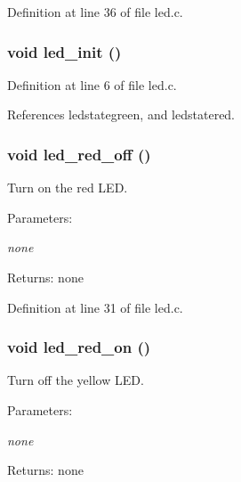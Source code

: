 Definition at line 36 of file led.c.
\subsubsection{\setlength{\rightskip}{0pt plus 5cm}void led\_\-init ()}\label{led_8h_7b3b624857fba1776c75412289a20230}




Definition at line 6 of file led.c.

References ledstategreen, and ledstatered.
\subsubsection{\setlength{\rightskip}{0pt plus 5cm}void led\_\-red\_\-off ()}\label{led_8h_d6f6083af3526114311748a49640254f}


Turn on the red LED. 

\begin{Desc}
\item[Parameters:]
\begin{description}
\item[{\em none}]\end{description}
\end{Desc}
\begin{Desc}
\item[Returns:]none \end{Desc}


Definition at line 31 of file led.c.
\subsubsection{\setlength{\rightskip}{0pt plus 5cm}void led\_\-red\_\-on ()}\label{led_8h_a08e5b078986d56dfbad555f2fa6fd57}


Turn off the yellow LED. 

\begin{Desc}
\item[Parameters:]
\begin{description}
\item[{\em none}]\end{description}
\end{Desc}
\begin{Desc}
\item[Returns:]none \end{Desc}


